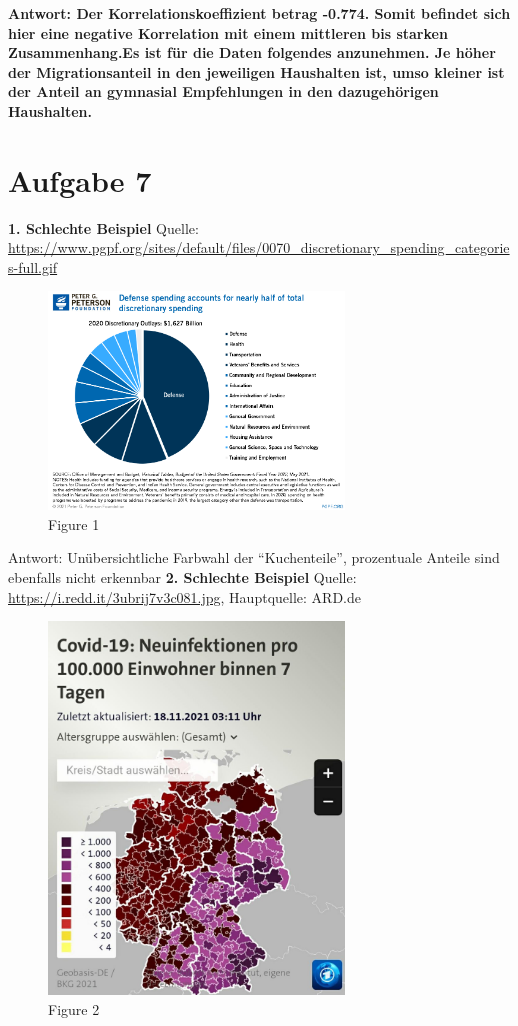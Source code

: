 \documentclass[
]{article}
\begin{document}
\textbf{Antwort: Der Korrelationskoeffizient betrag -0.774. Somit
befindet sich hier eine negative Korrelation mit einem mittleren bis
starken Zusammenhang.Es ist für die Daten folgendes anzunehmen. Je höher
der Migrationsanteil in den jeweiligen Haushalten ist, umso kleiner ist
der Anteil an gymnasial Empfehlungen in den dazugehörigen Haushalten.}

\hypertarget{aufgabe-7}{%
\section{Aufgabe 7}\label{aufgabe-7}}

\textbf{1. Schlechte Beispiel} Quelle:
\url{https://www.pgpf.org/sites/default/files/0070_discretionary_spending_categories-full.gif}

\begin{figure}
\centering
\includegraphics[width=0.7\textwidth,height=\textheight]{figures/pie-Chart_pp_foundation.gif}
\caption{Figure 1}
\end{figure}

Antwort: Unübersichtliche Farbwahl der ``Kuchenteile'', prozentuale
Anteile sind ebenfalls nicht erkennbar \textbf{2. Schlechte Beispiel}
Quelle: \url{https://i.redd.it/3ubrij7v3c081.jpg}, Hauptquelle: ARD.de

\begin{figure}
\centering
\includegraphics[width=0.7\textwidth,height=\textheight]{figures/ard_covid.jpg}
\caption{Figure 2}
\end{figure}
\end{document}
